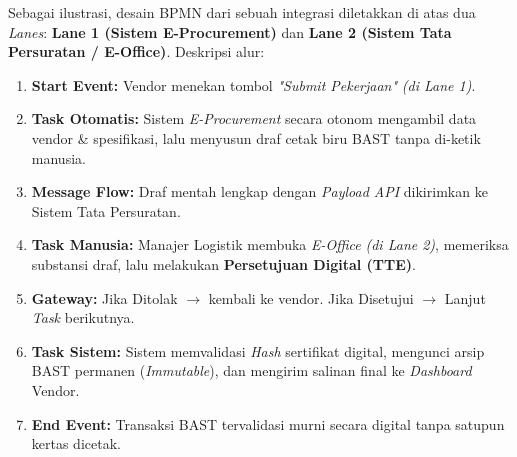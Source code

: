 \documentclass[12pt,a4paper]{report}
\begin{document}
\begin{plnbox}
\small
Sebagai ilustrasi, desain BPMN dari sebuah integrasi diletakkan di atas dua \textit{Lanes}: \textbf{Lane 1 (Sistem E-Procurement)} dan \textbf{Lane 2 (Sistem Tata Persuratan / E-Office)}. Deskripsi alur:
\begin{enumerate}[nosep, leftmargin=*]
    \item \textbf{Start Event:} Vendor menekan tombol \textit{"Submit Pekerjaan"} \textit{(di Lane 1)}.
    \item \textbf{Task Otomatis:} Sistem \textit{E-Procurement} secara otonom mengambil data vendor \& spesifikasi, lalu menyusun draf cetak biru BAST tanpa di-ketik manusia.
    \item \textbf{Message Flow:} Draf mentah lengkap dengan \textit{Payload API} dikirimkan ke Sistem Tata Persuratan.
    \item \textbf{Task Manusia:} Manajer Logistik membuka \textit{E-Office} \textit{(di Lane 2)}, memeriksa substansi draf, lalu melakukan \textbf{Persetujuan Digital (TTE)}.
    \item \textbf{Gateway:} Jika Ditolak $\rightarrow$ kembali ke vendor. Jika Disetujui $\rightarrow$ Lanjut \textit{Task} berikutnya.
    \item \textbf{Task Sistem:} Sistem memvalidasi \textit{Hash} sertifikat digital, mengunci arsip BAST permanen (\textit{Immutable}), dan mengirim salinan final ke \textit{Dashboard} Vendor.
    \item \textbf{End Event:} Transaksi BAST tervalidasi murni secara digital tanpa satupun kertas dicetak.
\end{enumerate}
\end{plnbox}
\end{document}
